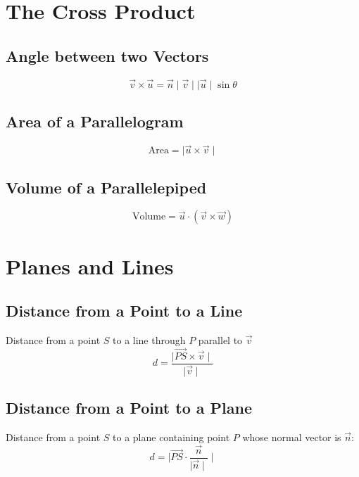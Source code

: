 \documentclass{article}
\begin{document}
\section{The Cross Product}

\subsection{Angle between two Vectors}
$$
\vec{v} \times \vec{u} = \vec{n} \mid \vec{v} \mid \mid \vec{u} \mid \sin \theta
$$

\subsection{Area of a Parallelogram}
$$
\text{Area} = \mid \vec{u} \times \vec{v} \mid
$$

\subsection{Volume of a Parallelepiped}
$$
\text{Volume} = \vec{u} \cdot (\vec{v} \times \vec{w})
$$

\section{Planes and Lines}

\subsection{Distance from a Point to a Line}
Distance from a point $S$ to a line through $P$ parallel to $\vec{v}$
$$
d = \frac{\mid \vec{PS} \times \vec{v} \mid}{\mid \vec{v} \mid}
$$

\subsection{Distance from a Point to a Plane}
Distance from a point $S$ to a plane containing point $P$ whose normal vector is $\vec{n}$:
$$
d = \mid \vec{PS} \cdot \frac{\vec{n}}{\mid \vec{n} \mid} \mid
$$
\end{document}
